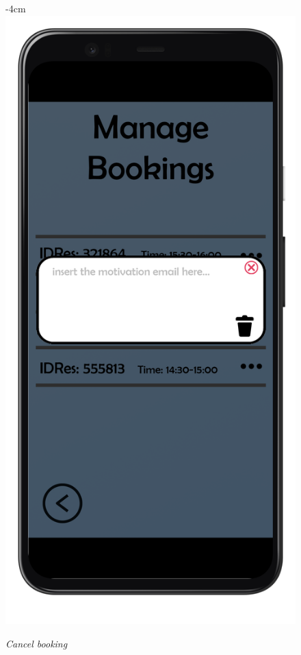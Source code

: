 \documentclass{article}
\begin{document}
			\begin{figure}[H]
				\begin{adjustwidth} {-4cm}{}
					\centering
					\includegraphics[scale=0.45]{../Mockups/MBpopup3}\\
				\end{adjustwidth}
				\caption{\emph{Cancel booking}}
			\end{figure}
		
\end{document}
